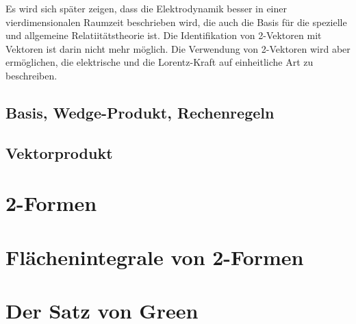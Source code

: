 Es wird sich später zeigen, dass die Elektrodynamik besser in einer
vierdimensionalen Raumzeit beschrieben wird, die auch die Basis für
die spezielle und allgemeine Relatiitätstheorie ist.
Die Identifikation von 2-Vektoren mit Vektoren ist darin nicht
mehr möglich.
Die Verwendung von 2-Vektoren wird aber ermöglichen, die elektrische 
und die Lorentz-Kraft auf einheitliche Art zu beschreiben.

%
%
\subsection{Basis, Wedge-Produkt, Rechenregeln}

%
%
\subsection{Vektorprodukt}


%
%
\section{2-Formen
\label{buch:green:section:2formen}}

%
%
\section{Flächenintegrale von 2-Formen
\label{buch:green:section:integral}}

%
%
\section{Der Satz von Green
\label{buch:green:section:green}}


